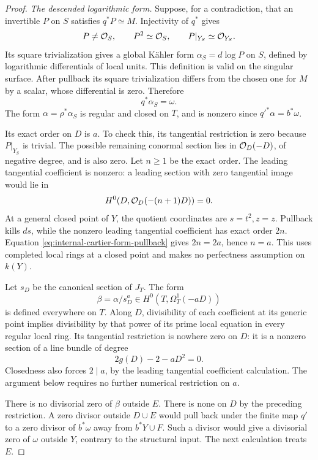 \begin{proof}
\emph{The descended logarithmic form.}
Suppose, for a contradiction, that an invertible $P$ on $S$
satisfies $q^*P\simeq M$. Injectivity of $q^*$ gives
\[
 P\ne\mathcal O_S,\qquad P^2\simeq\mathcal O_S,
 \qquad P|_{Y_S}\simeq\mathcal O_{Y_S}.
\]
Its square trivialization gives a global K\"ahler form
$\alpha_S=d\log P$ on $S$, defined by logarithmic differentials
of local units. This definition is valid on the singular surface.
After pullback its square trivialization differs from the chosen
one for $M$ by a scalar, whose differential is zero. Therefore
\begin{equation}\label{eq:internal-cartier-form-pullback}
 q^*\alpha_S=\omega.
\end{equation}
The form $\alpha=\rho^*\alpha_S$ is regular and closed on $T$,
and is nonzero since $q'^*\alpha=b^*\omega$.

Its exact order on $D$ is $a$. To check this, its tangential
restriction is zero because $P|_{Y_S}$ is trivial. The possible
remaining conormal section lies in $\mathcal O_D(-D)$, of negative
degree, and is also zero. Let $n\geq1$ be the exact order. The
leading tangential coefficient is nonzero: a leading section
with zero tangential image would lie in
\[
 H^0(D,\mathcal O_D(-(n+1)D))=0.
\]
At a general closed point of $Y$, the quotient coordinates are
$s=t^2,z=z$. Pullback kills $ds$, while the nonzero leading
tangential coefficient has exact order $2n$. Equation
\eqref{eq:internal-cartier-form-pullback} gives $2n=2a$, hence
$n=a$. This uses completed local rings at a closed point and
makes no perfectness assumption on $k(Y)$.

Let $s_D$ be the canonical section of $J_T$. The form
\[
 \beta=\alpha/s_D^a\in H^0(T,\Omega_T^1(-aD))
\]
is defined everywhere on $T$. Along $D$, divisibility of each
coefficient at its generic point implies divisibility by that
power of its prime local equation in every regular local ring.
Its tangential restriction is nowhere zero on $D$: it is a nonzero
section of a line bundle
of degree
\[
 2g(D)-2-aD^2=0.
\]
Closedness also forces $2\mid a$, by the leading tangential
coefficient calculation. The argument below requires no further
numerical restriction on $a$.

There is no divisorial zero of $\beta$ outside $E$. There is
none on $D$ by the preceding restriction. A zero divisor outside
$D\cup E$ would pull back under the finite map $q'$ to a zero
divisor of $b^*\omega$ away from $b^*Y\cup F$. Such a divisor
would give a divisorial zero of $\omega$ outside $Y$, contrary
to the structural input. The next calculation treats $E$.


\end{proof}
